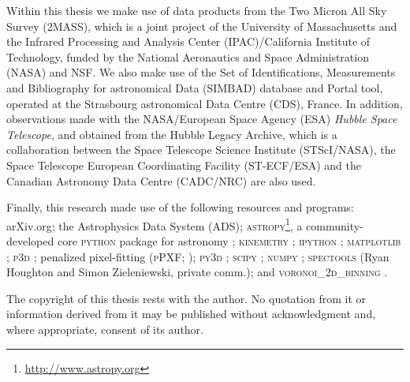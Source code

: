 \begin{originalitylong}
Within this thesis we make use of data products from the Two Micron All Sky Survey (2MASS), which is a joint project of the University of Massachusetts and the Infrared Processing and Analysis Center (IPAC)/California Institute of Technology, funded by the National Aeronautics and Space Administration (NASA) and NSF. We also make use of the Set of Identifications, Measurements and Bibliography for astronomical Data (SIMBAD) database and Portal tool, operated at the Strasbourg astronomical Data Centre (CDS), France. In addition, observations made with the NASA/European Space Agency (ESA) \textit{Hubble Space Telescope}, and obtained from the Hubble Legacy Archive, which is a collaboration between the Space Telescope Science Institute (STScI/NASA), the Space Telescope European Coordinating Facility (ST-ECF/ESA) and the Canadian Astronomy Data Centre (CADC/NRC) are also used.

Finally, this research made use of the following resources and programs: arXiv.org; the Astrophysics Data System (ADS); \textsc{astropy}\footnote{\url{http://www.astropy.org}}, a community-developed core \textsc{python} package for astronomy \citep{TheAstropyCollaboration2013}; \textsc{kinemetry} \citep{Krajnovic2006}; \textsc{ipython} \citep{Perez2007}; \textsc{matplotlib} \citep{Hunter2007}; \textsc{p3d} \citep{Sandin2010, Sandin2011}; penalized pixel-fitting (\textsc{pPXF}; \citealt{Cappellari2004}); \textsc{py3d} \citep{Sanchez2011, Husemann2013, Husemann2014}; \textsc{scipy} \citep{Oliphant2007, Millman2011}; \textsc{numpy} \citep{VanderWalt2011}; \textsc{spectools} (Ryan Houghton and Simon Zieleniewski, private comm.); and \textsc{voronoi\_2d\_binning} \citep[including the SAURON colourmaps; ][]{Cappellari2003}.

The copyright of this thesis rests with the author. No quotation from it or information derived from it may be published without acknowledgment and, where appropriate, consent of its author.
\end{originalitylong}